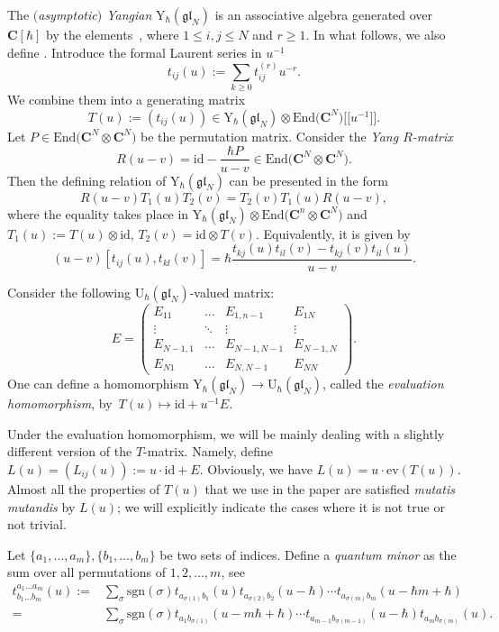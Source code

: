 \documentclass[10pt,a4paper]{article}
\numberwithin{equation}{section}
\newcommand{\C}{\mathbf{C}}
\newcommand{\U}{\mathrm{U}_{\hbar}}
\newcommand{\rY}{\mathrm{Y}_{\hbar}}
\newcommand{\End}{\mathrm{End}}
\newcommand{\ev}{\mathrm{ev}}
\newcommand{\id}{\mathrm{id}}
\newcommand{\gl}{\mathfrak{gl}}
\begin{document}
The \emph{$($asymptotic$)$ Yangian} $\rY(\gl_N)$ is an associative algebra generated over $\C[\hbar]$ by the elements~, where $1\leq i,j \leq N$ and $r\geq 1$. In what follows, we also define . Introduce the formal Laurent series in $u^{-1}$
	\[
	t_{ij}(u) := \sum\limits_{k \geq 0} t_{ij}^{(r)} u^{-r}.
	\]
	We combine them into a generating matrix
	\[
	T(u) := (t_{ij}(u)) \in \rY(\gl_N) \otimes \End\bigl(\C^N\bigr)\bigl[\bigl[u^{-1}\bigr]\bigr].
	\]
	Let $P\in \End\bigl(\C^N \otimes \C^N\bigr)$ be the permutation matrix. Consider the \emph{Yang $R$-matrix}
	\[
	R(u-v) = \id - \frac{\hbar P}{u-v} \in \End\bigl(\C^N \otimes \C^N\bigr).
	\]
	Then the defining relation of $\rY(\gl_N)$ can be presented in the form
	\[
	R(u-v) T_1(u) T_2(v) = T_2(v) T_1(u) R(u-v),
	\]
	where the equality takes place in $\rY(\gl_N) \otimes \End\bigl(\C^n \otimes \C^N\bigr)$ and $T_1(u) := T(u) \otimes \id$, $T_2(v) = \id \otimes T(v)$. Equivalently, it is given by
	\begin{equation}
		\label{eq::yang_def_rel}
		(u-v) [t_{ij}(u), t_{kl}(v)] = \hbar \frac{t_{kj}(u) t_{il}(v) - t_{kj}(v) t_{il}(u)}{u-v}.
	\end{equation}
	
	
	Consider the following $\U(\gl_N)$-valued matrix:
	\begin{equation*}
		E = \begin{pmatrix}
			E_{11} & \dots & E_{1,n-1} & E_{1N} \\
			\vdots & \ddots & \vdots & \vdots \\
			E_{N-1,1} & \dots & E_{N-1,N-1} & E_{N-1,N} \\
			E_{N1} & \dots & E_{N,N-1} & E_{NN}
		\end{pmatrix}.
	\end{equation*}	
	One can define a homomorphism $\rY(\gl_N) \rightarrow \U(\gl_N)$, called the \emph{evaluation homomorphism}, by~${T(u) \mapsto \id + u^{-1} E}$.
	
	Under the evaluation homomorphism, we will be mainly dealing with a slightly different version of the $T$-matrix. Namely, define~${
		L(u) = (L_{ij}(u)) := u\cdot \id + E}$.
	Obviously, we have $L(u) = u\cdot \ev(T(u))$. Almost all the properties of $T(u)$ that we use in the paper are satisfied \emph{mutatis mutandis} by $L(u)$; we will explicitly indicate the cases where it is not true or not trivial.
	
	Let $\{a_1,\dots, a_m\}, \{b_1, \dots, b_m\}$ be two sets of indices. Define a \emph{quantum minor} as the sum over all permutations of $1,2,\dots,m$, see \cite[equations~(1.54) and (1.55)]{MolevYangians}
	\begin{align*}
			t_{b_1\dots b_m}^{a_1\dots a_m}(u) :={} & \sum\limits_{\sigma} \mathrm{sgn}(\sigma) t_{a_{\sigma(1)}b_1}(u) t_{a_{\sigma(2)} b_2}(u-\hbar) \cdots t_{a_{\sigma(m)} b_m} (u-\hbar m + \hbar) \\
			={} & \sum\limits_{\sigma} \mathrm{sgn}(\sigma) t_{a_1 b_{\sigma(1)}} (u-m\hbar+\hbar)\cdots t_{a_{m-1} b_{\sigma(m-1)}} (u-\hbar) t_{a_m b_{\sigma(m)}}(u).
	\end{align*}
	
\end{document}
